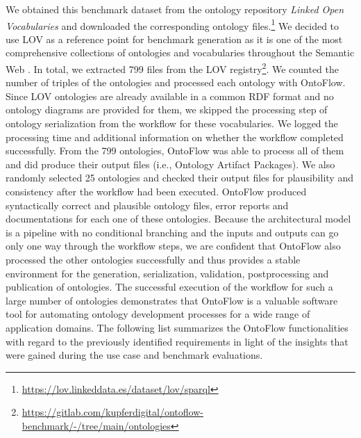 \documentclass[runningheads]{llncs}
\begin{document}
We obtained this benchmark dataset from the ontology repository \textit{Linked Open Vocabularies} and downloaded the corresponding ontology files.\footnote{\url{https://lov.linkeddata.es/dataset/lov/sparql}} We decided to use LOV as a reference point for benchmark generation as it is one of the most comprehensive collections of ontologies and vocabularies throughout the Semantic Web \cite{lov}. In total, we extracted 799 files from the LOV registry\footnote{\url{https://gitlab.com/kupferdigital/ontoflow-benchmark/-/tree/main/ontologies}}. We counted the number of triples of the ontologies and processed each ontology with OntoFlow. Since LOV ontologies are already available in a common RDF format and no ontology diagrams are provided for them, we skipped the processing step of ontology serialization from the workflow for these vocabularies. We logged the processing time and additional information on whether the workflow completed successfully. From the 799 ontologies, OntoFlow was able to process all of them and did produce their output files (i.e., Ontology Artifact Packages). We also randomly selected 25 ontologies and checked their output files for plausibility and consistency after the workflow had been executed. OntoFlow produced syntactically correct and plausible ontology files, error reports and documentations for each one of these ontologies. Because the architectural model is a pipeline with no conditional branching and the inputs and outputs can go only one way through the workflow steps, we are confident that OntoFlow also processed the other ontologies successfully and thus provides a stable environment for the generation, serialization, validation, postprocessing and publication of ontologies. The successful execution of the workflow for such a large number of ontologies demonstrates that OntoFlow is a valuable software tool for automating ontology development processes for a wide range of application domains. The following list summarizes the OntoFlow functionalities with regard to the previously identified requirements in light of the insights that were gained during the use case and benchmark evaluations.
\end{document}
